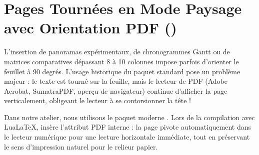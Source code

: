 \section{Pages Tournées en Mode Paysage avec Orientation PDF ()}
\label{sec:demo-landscape}

L'insertion de panoramas expérimentaux, de chronogrammes Gantt
ou de matrices comparatives dépassant 8 à 10 colonnes impose parfois d'orienter le feuillet à 90 degrés.
L'usage historique du paquet standard  pose un problème majeur :
le texte est tourné sur la feuille, mais le lecteur de PDF (Adobe Acrobat, SumatraPDF, aperçu de navigateur)
continue d'afficher la page verticalement, obligeant le lecteur à se contorsionner la tête !

Dans notre atelier, nous utilisons le paquet moderne .
Lors de la compilation avec Lua\LaTeX{},  insère l'attribut PDF interne  :
la page pivote automatiquement dans le lecteur numérique pour une lecture horizontale immédiate,
tout en préservant le sens d'impression naturel pour le relieur papier.

